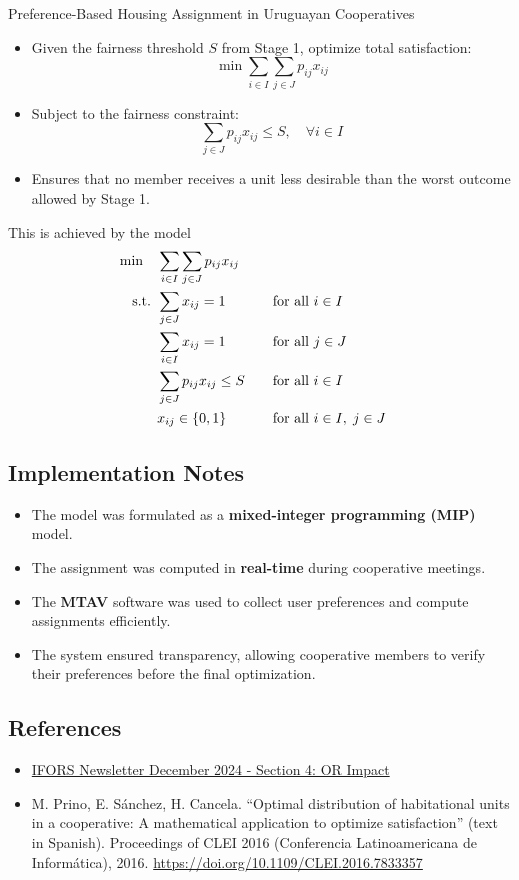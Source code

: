 \begin{casestudybox}{Preference-Based Housing Assignment in Uruguayan Cooperatives}
\begin{itemize}
    \item Given the fairness threshold $S$ from Stage 1, optimize total satisfaction:
    \[ \min \sum_{i \in I} \sum_{j \in J} p_{ij} x_{ij} \]
    \item Subject to the fairness constraint:
    \[ \sum_{j \in J} p_{ij} x_{ij} \leq S, \quad \forall i \in I \]
    \item Ensures that no member receives a unit less desirable than the worst outcome allowed by Stage 1.
\end{itemize}
This is achieved by the model
\begin{align*}
\min \quad & \sum_{i \in I} \sum_{j \in J} p_{i j} x_{i j} \\
\mbox{ s.t. }        & \sum_{j \in J} x_{i j} = 1 &&\quad \mbox{for all } i \in I \\
                 & \sum_{i \in I} x_{i j} = 1 &&\quad \mbox{for all } j \in J \\
                 & \sum_{j \in J} p_{i j} x_{i j} \leq S &&\quad \mbox{for all } i \in I \\
                 & x_{i j} \in \{0,1\} &&\quad \mbox{for all } i \in I, \; j \in J
\end{align*}

\subsection*{Implementation Notes}

\begin{itemize}
    \item The model was formulated as a \textbf{mixed-integer programming (MIP)} model.
    \item The assignment was computed in \textbf{real-time} during cooperative meetings.
    \item The \textbf{MTAV} software was used to collect user preferences and compute assignments efficiently.
    \item The system ensured transparency, allowing cooperative members to verify their preferences before the final optimization.
\end{itemize}

\subsection*{References}
\begin{itemize}
\item \href{https://ifors.org/newsletter/ifors-news-dec-2024.pdf}{IFORS Newsletter December 2024 -  Section 4: OR Impact}
\item  M. Prino, E. Sánchez, H. Cancela. “Optimal distribution of habitational units in a cooperative: A mathematical application to optimize satisfaction” (text in Spanish). Proceedings of CLEI 2016 (Conferencia Latinoamericana de Informática), 2016. \url{https://doi.org/10.1109/CLEI.2016.7833357}
\end{itemize}

\end{casestudybox}

